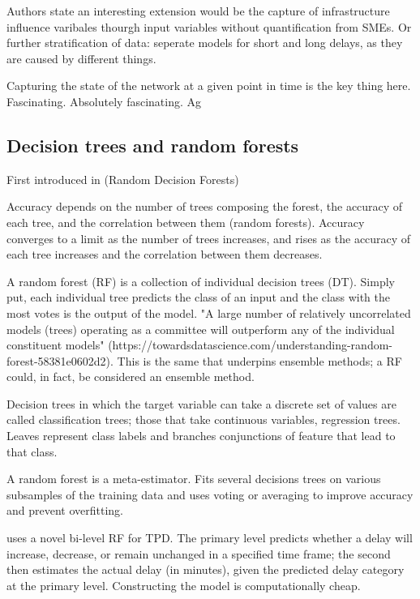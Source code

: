 \documentclass{article}
\begin{document}
Authors state an interesting extension would be the capture of infrastructure influence varibales thourgh input variables without quantification from SMEs. Or further stratification of data: seperate models for short and long delays, as they are caused by different things. 

Capturing the state of the network at a given point in time is the key thing here. Fascinating. Absolutely fascinating. 
Ag
\subsection{Decision trees and random forests}

First introduced in \cite{ho_1995} (Random Decision Forests)

 Accuracy depends on the number of trees composing the forest,  the accuracy of each tree, and the correlation between them \cite{breiman_2001} (random forests). Accuracy converges to a limit as the number of trees increases, and rises as the accuracy of each tree increases and the correlation between them decreases.

A random forest (RF) is a collection of individual decision trees (DT). Simply put, each individual tree predicts the class of an input and the class with the most votes is the output of the model. "A large number of relatively uncorrelated models (trees) operating as a committee will outperform any of the individual constituent models" (https://towardsdatascience.com/understanding-random-forest-58381e0602d2). This is the same that underpins ensemble methods; a RF could, in fact, be considered an ensemble method. 

Decision trees in which the target variable can take a discrete set of values are called classification trees; those that take continuous variables, regression trees. Leaves represent class labels and branches conjunctions of feature that lead to that class. 

A random forest is a meta-estimator. Fits several decisions trees on various subsamples of the training data and uses voting or averaging to improve accuracy and prevent overfitting. 

\cite{nabian_et_al_2019} uses a novel bi-level RF for TPD. The primary level predicts whether a delay will increase, decrease, or remain unchanged in a specified time frame; the second then estimates the actual delay (in minutes), given the predicted delay category at the primary level. Constructing the model is computationally cheap. 
\end{document}
